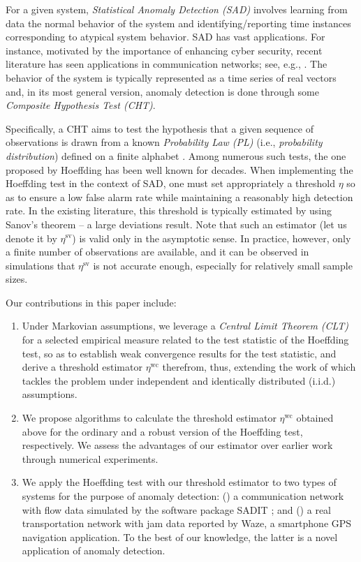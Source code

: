 \documentclass[10pt, twocolumn]{IEEEtran}
\begin{document}
For a given system, {\em Statistical Anomaly Detection (SAD)} involves
learning from data the normal behavior of the system and
identifying/reporting time instances corresponding to atypical system
behavior. SAD has vast applications. For instance, motivated by the
importance of enhancing cyber security, recent literature has seen
applications in communication networks; see, e.g.,
\cite{pas-sma-ton-09,CDC09,wa-ro-ca-pa-anomaly-cdc13,robust-anomaly-tcns}. The
behavior of the system is typically represented as a time series of real
vectors and, in its most general version, anomaly detection is done
through some {\em Composite Hypothesis Test (CHT)}.

Specifically, a CHT aims to test the hypothesis that a given sequence of
observations is drawn from a known \textit{Probability Law (PL)} (i.e.,
\textit{probability distribution}) defined on a finite alphabet
\cite{TIT13}. Among numerous such tests, the one proposed by Hoeffding
\cite{hoeffding1965} has been well known for decades. When implementing
the Hoeffding test in the context of SAD, one must set appropriately a threshold $\eta$ so as to ensure a low false alarm rate while maintaining a reasonably high detection rate. In the
existing literature, this threshold is typically estimated by using Sanov's theorem
\cite{dembo1998large} -- a large deviations result. Note that such an
estimator (let us denote it by $\eta^{\text{sv}}$) is valid only in the
asymptotic sense. In practice, however, only a finite number of
observations are available, and it can be observed in simulations that
$\eta^{\text{sv}}$ is not accurate enough, especially for relatively small
sample sizes.

Our contributions in this paper include:

\begin{enumerate}
\item Under Markovian assumptions, we leverage a
  {\em Central Limit Theorem (CLT)} for a selected empirical measure
  related to the test statistic of the Hoeffding test, so as to establish weak convergence results for the test statistic, and derive a threshold estimator
  $\eta^{\text{wc}}$ therefrom, thus, extending the work of \cite{TIT13} which tackles
  the problem under independent and identically distributed (i.i.d.)
  assumptions.

\item We propose algorithms to calculate the threshold estimator
  $\eta^{\text{wc}}$ obtained above for the ordinary and a robust version of
  the Hoeffding test, respectively. We assess the advantages of our
  estimator over earlier work through numerical experiments. 

\item We apply the Hoeffding test with our threshold estimator to two
  types of systems for the purpose of anomaly detection: () a
  communication network with flow data simulated by the software package
  SADIT \cite{SADIT}; and () a real transportation network with jam
  data reported by Waze, a smartphone GPS navigation application. To the
  best of our knowledge, the latter is a novel application of anomaly
  detection.
\end{enumerate}
\end{document}
